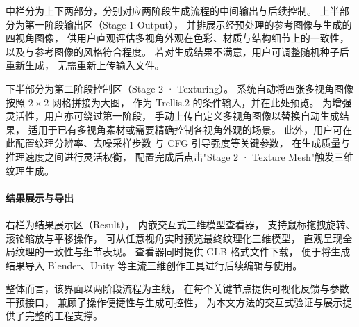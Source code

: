 中栏分为上下两部分，分别对应两阶段生成流程的中间输出与后续控制。
上半部分为第一阶段输出区（Stage 1 Output），
并排展示经预处理的参考图像与生成的四视角图像，
供用户直观评估多视角外观在色彩、材质与结构细节上的一致性，
以及与参考图像的风格符合程度。
若对生成结果不满意，用户可调整随机种子后重新生成，
无需重新上传输入文件。

下半部分为第二阶段控制区（Stage 2 · Texturing）。
系统自动将四张多视角图像按照 $2\times2$ 网格拼接为大图，
作为 Trellis.2 的条件输入，并在此处预览。
为增强灵活性，用户亦可绕过第一阶段，
手动上传自定义多视角图像以替换自动生成结果，
适用于已有多视角素材或需要精确控制各视角外观的场景。
此外，用户可在此配置纹理分辨率、去噪采样步数
与 CFG 引导强度等关键参数，
在生成质量与推理速度之间进行灵活权衡，
配置完成后点击"Stage 2 · Texture Mesh"触发三维纹理生成。

\paragraph{结果展示与导出}

右栏为结果展示区（Result），
内嵌交互式三维模型查看器，
支持鼠标拖拽旋转、滚轮缩放与平移操作，
可从任意视角实时预览最终纹理化三维模型，
直观呈现全局纹理的一致性与细节表现。
查看器同时提供 GLB 格式文件下载，
便于将生成结果导入 Blender、Unity 等主流三维创作工具进行后续编辑与使用。

整体而言，该界面以两阶段流程为主线，
在每个关键节点提供可视化反馈与参数干预接口，
兼顾了操作便捷性与生成可控性，
为本文方法的交互式验证与展示提供了完整的工程支撑。



